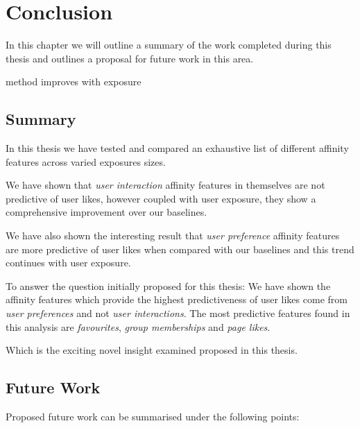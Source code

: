 
\chapter{Conclusion}
\label{cha:conc}

In this chapter we will outline a summary of the work completed during this thesis and outlines a proposal for future work in this area.

method improves with exposure

\section{Summary}
\label{sec:conc}

In this thesis we have tested and compared an exhaustive list of different affinity features across varied exposures sizes.

We have shown that \emph{user interaction} affinity features in themselves are not predictive of user likes, however coupled with user 
exposure, they show a comprehensive improvement over our baselines.

We have also shown the interesting result that \emph{user preference} affinity features are more predictive of user likes when compared
with our baselines and this trend continues with user exposure.

To answer the question initially proposed for this thesis:
We have shown the affinity features which provide the highest predictiveness of user likes come from \emph{user preferences} and not
\emph{user interactions}. The most predictive features found in this analysis are \emph{favourites}, \emph{group memberships} 
and \emph{page likes}.

Which is the exciting novel insight examined proposed in this thesis.

\section{Future Work}
\label{sec:ftw}

Proposed future work can be summarised under the following points:

